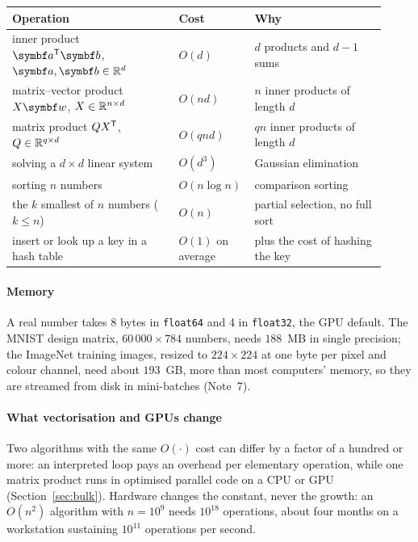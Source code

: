 \documentclass[11pt]{article}
\begin{document}
\begin{center}\small
\begin{tabular}{@{}L{0.43\linewidth}L{0.15\linewidth}L{0.34\linewidth}@{}}\toprule
Operation & Cost & Why \\ \midrule
inner product $\vect{a}\T\vect{b}$, $\vect{a}, \vect{b} \in \R^d$ & $O(d)$ & $d$ products and $d - 1$ sums \\
matrix--vector product $X\vect{w}$, $X \in \mathbb{R}^{n \times d}$ & $O(nd)$ & $n$ inner products of length $d$ \\
matrix product $Q X^{\mathsf{T}}$, $Q \in \mathbb{R}^{q \times d}$ & $O(qnd)$ & $qn$ inner products of length $d$ \\
solving a $d \times d$ linear system & $O(d^3)$ & Gaussian elimination \\
sorting $n$ numbers & $O(n \log n)$ & comparison sorting \\
the $k$ smallest of $n$ numbers ($k \le n$) & $O(n)$ & partial selection, no full sort \\
insert or look up a key in a hash table & $O(1)$ on average & plus the cost of hashing the key \\ \bottomrule
\end{tabular}
\end{center}

\paragraph{Memory} A real number takes 8 bytes in \texttt{float64} and 4 in \texttt{float32}, the GPU default. The
MNIST design matrix, $60\,000 \times 784$ numbers, needs $188$~MB in single precision; the ImageNet training images,
resized to $224 \times 224$ at one byte per pixel and colour channel, need about $193$~GB, more than most computers'
memory, so they are streamed from disk in mini-batches (Note~7).

\paragraph{What vectorisation and GPUs change} Two algorithms with the same $O(\cdot)$ cost can differ by a factor
of a hundred or more: an interpreted loop pays an overhead per elementary operation, while one matrix product runs
in optimised parallel code on a CPU or GPU (Section~\ref{sec:bulk}). Hardware changes the constant, never the growth: an $O(n^2)$ algorithm with $n = 10^9$ needs $10^{18}$ operations, about
four months on a workstation sustaining $10^{11}$ operations per second.
\end{document}
